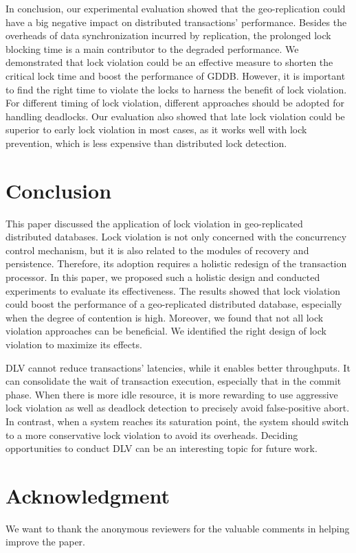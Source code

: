 \documentclass[conference]{IEEEtran}
\begin{document}
In conclusion, our experimental evaluation showed that the geo-replication could have a big negative impact on distributed transactions' performance.
Besides the overheads of data synchronization incurred by replication, the prolonged lock blocking time is a main contributor to the degraded performance.
We demonstrated that lock violation could be an effective measure to shorten the critical lock time and boost the performance of GDDB.
However, it is important to find the right time to violate the locks to harness the benefit of lock violation.
For different timing of lock violation, different approaches should be adopted for handling deadlocks.
Our evaluation also showed that late lock violation could be superior to early lock violation in most cases, as it works well with lock prevention, which is less expensive than distributed lock detection.


\section{Conclusion}
\label{sec:conclusion}

This paper discussed the application of lock violation in geo-replicated distributed databases.
Lock violation is not only concerned with the concurrency control mechanism, but it is also related to the modules of recovery and persistence.
Therefore, its adoption requires a holistic redesign of the transaction processor.
In this paper, we proposed such a holistic design and conducted experiments to evaluate its effectiveness.
The results showed that lock violation could boost the performance of a geo-replicated distributed database, especially when the degree of contention is high.
Moreover, we found that not all lock violation approaches can be beneficial. We identified the right design of lock violation to maximize its effects.


DLV cannot reduce transactions' latencies, while it enables better throughputs.
It can consolidate the wait of transaction execution, especially that in the commit phase.
When there is more idle resource, it is more rewarding to use aggressive lock violation as well as deadlock detection to precisely avoid false-positive abort.
In contrast, when a system reaches its saturation point, the system should switch to a more conservative
lock violation to avoid its overheads.
Deciding opportunities to conduct DLV can be an interesting topic for future work.


\section*{Acknowledgment}
We want to thank the anonymous reviewers for the valuable comments in helping improve the paper.




\end{document}
